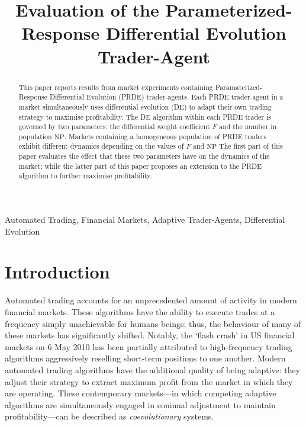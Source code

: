 \documentclass[conference]{IEEEtran}
\begin{document}
\title{Evaluation of the Parameterized-Response Differential Evolution Trader-Agent}

\author{
}

\maketitle

\begin{abstract}
This paper reports results from market experiments containing Paramaterized-Response Differential Evolution (PRDE) trader-agents.
Each PRDE trader-agent in a market simultaneously uses differential evolution (DE) to adapt their own trading strategy to maximise profitability.
The DE algorithm within each PRDE trader is governed by two parameters: the differential weight coefficient $F$ and the number in population $\mathrm{NP}$.
Markets containing a homogeneous population of PRDE traders exhibit different dynamics depending on the values of $F$ and $\mathrm{NP}$
The first part of this paper evaluates the effect that these two parameters have on the dynamics of the market; while the latter part of this paper proposes an extension to the PRDE algorithm to further maximise profitability.
\end{abstract}

\begin{IEEEkeywords}
Automated Trading, Financial Markets, Adaptive Trader-Agents, Differential Evolution
\end{IEEEkeywords}

\section{Introduction}

Automated trading accounts for an unprecedented amount of activity in modern financial markets.
These algorithms have the ability to execute trades at a frequency simply unachievable for humans beings; thus, the behaviour of many of these markets has significantly shifted.
Notably, the `flash crash' in US financial markets on 6 May 2010 has been partially attributed to high-frequency trading algorithms aggressively reselling short-term positions to one another.
Modern automated trading algorithms have the additional quality of being adaptive: they adjust their strategy to extract maximum profit from the market in which they are operating.
These contemporary markets---in which competing adaptive algorithms are simultaneously engaged in coninual adjustment to maintain profitability---can be described as \textit{coevolutionary} systems.
\end{document}
